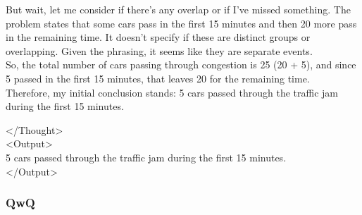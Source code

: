 \begin{abox}

But wait, let me consider if there's any overlap or if I've missed something. The problem states that some cars pass 
in the first 15 minutes and then 20 more pass in the remaining time. It doesn't specify if these are distinct groups 
or overlapping. Given the phrasing, it seems like they are separate events.\\

So, the total number of cars passing through congestion is 25 (20 + 5), and since 5 passed in the first 15 minutes, 
that leaves 20 for the remaining time.\\

Therefore, my initial conclusion stands: 5 cars passed through the traffic jam during the first 15 minutes.

</Thought>\\
<Output>\\
5 cars passed through the traffic jam during the first 15 minutes.\\
</Output>
\end{abox}

\subsubsection{QwQ}

